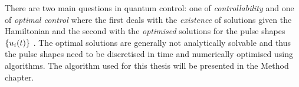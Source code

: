 \documentclass[main.tex]{subfiles}
\begin{document}
There are two main questions in quantum control: one of \emph{controllability} and one of \emph{optimal control} where the first deals with the \emph{existence} of solutions given the Hamiltonian and the second with the \emph{optimised} solutions for the pulse shapes \(\qty{u_i(t)}\) \autocite{dalessandro_introduction_2007}. The optimal solutions are generally not analytically solvable and thus the pulse shapes need to be discretised in time  and numerically optimised using algorithms. The algorithm used for this thesis will be presented in the Method chapter.
\end{document}
